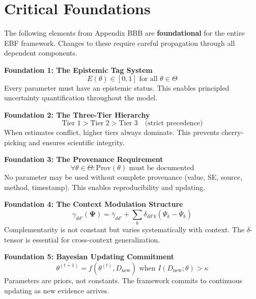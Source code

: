 \documentclass[11pt,a4paper]{article}
\theoremstyle{definition}
\begin{document}

\section{Critical Foundations}
\label{sec:bbb-critical-foundations}

\begin{tcolorbox}[colback=red!5!white, colframe=red!75!black, 
    title=\textbf{Critical Foundations for EBF}]

The following elements from Appendix BBB are \textbf{foundational} for the 
entire EBF framework. Changes to these require careful propagation through 
all dependent components.

\textbf{Foundation 1: The Epistemic Tag System}
\begin{equation}
E(\theta) \in [0, 1] \text{ for all } \theta \in \Theta
\end{equation}
Every parameter must have an epistemic status. This enables principled 
uncertainty quantification throughout the model.

\textbf{Foundation 2: The Three-Tier Hierarchy}
\begin{equation}
\text{Tier 1} > \text{Tier 2} > \text{Tier 3} \quad \text{(strict precedence)}
\end{equation}
When estimates conflict, higher tiers always dominate. This prevents 
cherry-picking and ensures scientific integrity.

\textbf{Foundation 3: The Provenance Requirement}
\begin{equation}
\forall \theta \in \Theta: \text{Prov}(\theta) \text{ must be documented}
\end{equation}
No parameter may be used without complete provenance (value, SE, source, 
method, timestamp). This enables reproducibility and updating.

\textbf{Foundation 4: The Context Modulation Structure}
\begin{equation}
\gamma_{dd'}(\boldsymbol{\Psi}) = \bar{\gamma}_{dd'} + \sum_k \delta_{dd'k} (\Psi_k - \bar{\Psi}_k)
\end{equation}
Complementarity is not constant but varies systematically with context. 
The $\delta$-tensor is essential for cross-context generalization.

\textbf{Foundation 5: Bayesian Updating Commitment}
\begin{equation}
\theta^{(t+1)} = f(\theta^{(t)}, D_{\text{new}}) \text{ when } I(D_{\text{new}}; \theta) > \kappa
\end{equation}
Parameters are priors, not constants. The framework commits to continuous 
updating as new evidence arrives.

\end{tcolorbox}
\end{document}
